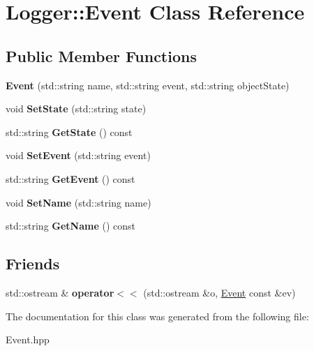 \hypertarget{classLogger_1_1Event}{
\section{Logger::Event Class Reference}
\label{classLogger_1_1Event}
}
\subsection*{Public Member Functions}
\begin{DoxyCompactItemize}
\item 
\hypertarget{classLogger_1_1Event_a569b0d27277323521272decb2fc20ec8}{
{\bfseries Event} (std::string name, std::string event, std::string objectState)}
\label{classLogger_1_1Event_a569b0d27277323521272decb2fc20ec8}

\item 
\hypertarget{classLogger_1_1Event_abab783d4e89f6cab75c834644ffb9f88}{
void {\bfseries SetState} (std::string state)}
\label{classLogger_1_1Event_abab783d4e89f6cab75c834644ffb9f88}

\item 
\hypertarget{classLogger_1_1Event_aecbe9812cd4bee4891bcbe0e9b06ff5f}{
std::string {\bfseries GetState} () const }
\label{classLogger_1_1Event_aecbe9812cd4bee4891bcbe0e9b06ff5f}

\item 
\hypertarget{classLogger_1_1Event_a80070cec3b7a9e21a7d7a33df822409d}{
void {\bfseries SetEvent} (std::string event)}
\label{classLogger_1_1Event_a80070cec3b7a9e21a7d7a33df822409d}

\item 
\hypertarget{classLogger_1_1Event_a810c30f86a5ad9954404d4db9d11aa15}{
std::string {\bfseries GetEvent} () const }
\label{classLogger_1_1Event_a810c30f86a5ad9954404d4db9d11aa15}

\item 
\hypertarget{classLogger_1_1Event_ab3a3356f021232f48b236ded5bd6fe8e}{
void {\bfseries SetName} (std::string name)}
\label{classLogger_1_1Event_ab3a3356f021232f48b236ded5bd6fe8e}

\item 
\hypertarget{classLogger_1_1Event_a82bce63e60aef67c4b9cd4ffe9b597ed}{
std::string {\bfseries GetName} () const }
\label{classLogger_1_1Event_a82bce63e60aef67c4b9cd4ffe9b597ed}

\end{DoxyCompactItemize}
\subsection*{Friends}
\begin{DoxyCompactItemize}
\item 
\hypertarget{classLogger_1_1Event_aea8506a03c80dc0e72b3e3f53d8d3c74}{
std::ostream \& {\bfseries operator$<$$<$} (std::ostream \&o, \hyperlink{classLogger_1_1Event}{Event} const \&ev)}
\label{classLogger_1_1Event_aea8506a03c80dc0e72b3e3f53d8d3c74}

\end{DoxyCompactItemize}


The documentation for this class was generated from the following file:\begin{DoxyCompactItemize}
\item 
Event.hpp\end{DoxyCompactItemize}
